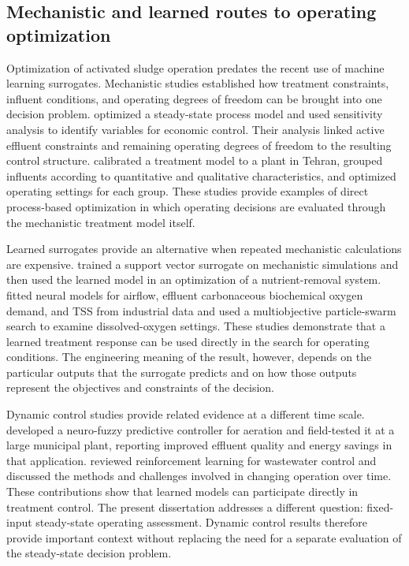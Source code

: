 \subsection{Mechanistic and learned routes to operating optimization}

Optimization of activated sludge operation predates the recent use of machine learning surrogates. Mechanistic studies established how treatment constraints, influent conditions, and operating degrees of freedom can be brought into one decision problem. \citet{Araujo2013} optimized a steady-state process model and used sensitivity analysis to identify variables for economic control. Their analysis linked active effluent constraints and remaining operating degrees of freedom to the resulting control structure. \citet{Nazif2023} calibrated a treatment model to a plant in Tehran, grouped influents according to quantitative and qualitative characteristics, and optimized operating settings for each group. These studies provide examples of direct process-based optimization in which operating decisions are evaluated through the mechanistic treatment model itself.

Learned surrogates provide an alternative when repeated mechanistic calculations are expensive. \citet{Fang2011} trained a support vector surrogate on mechanistic simulations and then used the learned model in an optimization of a nutrient-removal system. \citet{KusiakWei2013} fitted neural models for airflow, effluent carbonaceous biochemical oxygen demand, and TSS from industrial data and used a multiobjective particle-swarm search to examine dissolved-oxygen settings. These studies demonstrate that a learned treatment response can be used directly in the search for operating conditions. The engineering meaning of the result, however, depends on the particular outputs that the surrogate predicts and on how those outputs represent the objectives and constraints of the decision.

Dynamic control studies provide related evidence at a different time scale. \citet{Bernardelli2020} developed a neuro-fuzzy predictive controller for aeration and field-tested it at a large municipal plant, reporting improved effluent quality and energy savings in that application. \citet{Croll2023} reviewed reinforcement learning for wastewater control and discussed the methods and challenges involved in changing operation over time. These contributions show that learned models can participate directly in treatment control. The present dissertation addresses a different question: fixed-input steady-state operating assessment. Dynamic control results therefore provide important context without replacing the need for a separate evaluation of the steady-state decision problem.

